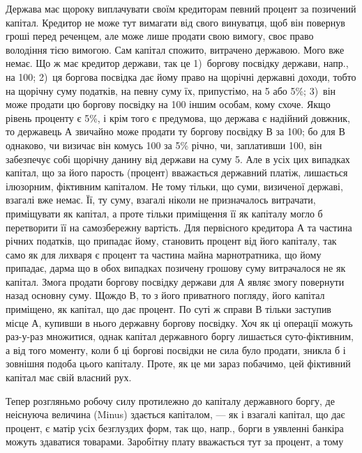 Держава має щороку виплачувати своїм кредиторам певний процент за
позичений капітал. Кредитор не може тут вимагати від свого винуватця, щоб він
повернув гроші перед реченцем, але може лише продати свою вимогу, своє
право володіння тією вимогою. Сам капітал спожито, витрачено державою. Мого
вже немає. Що ж має кредитор держави, так це 1)~боргову посвідку держави,
напр., на 100; 2)~ця боргова посвідка дає йому право на щорічні
державні доходи, тобто на щорічну суму податків, на певну суму їх, припустімо,
на 5 або 5\%; 3)~він може продати цю боргову посвідку на 100
іншим особам, кому схоче. Якщо рівень проценту є 5\%, і крім того є предумова,
що держава є надійний довжник, то державець $А$ звичайно може продати ту боргову
посвідку $В$ за 100; бо для $В$ однаково, чи визичає він комусь 100
за 5\% річно, чи, заплативши 100, він забезпечує собі щорічну данину
від держави на суму 5. Але в усіх цих випадках капітал, що за його
парость (процент) вважається державний платіж, лишається ілюзорним, фіктивним
капіталом. Не тому тільки, що суми, визиченої державі, взагалі вже немає.
Її, ту суму, взагалі ніколи не призначалось витрачати, приміщувати як капітал,
а проте тільки приміщення її як капіталу могло б перетворити її на самозбережну
вартість. Для первісного кредитора $А$ та частина річних податків, що припадає
йому, становить процент від його капіталу, так само як для лихваря є процент
та частина майна марнотратника, що йому припадає, дарма що в обох випадках
позичену грошову суму витрачалося не як капітал. Змога продати боргову
посвідку держави для $А$ являє змогу повернути назад основну суму. Щождо $В$,
то з його приватного погляду, його капітал приміщено, як капітал, що дає
процент. По суті ж справи $В$ тільки заступив місце $А$, купивши в нього
державну боргову посвідку. Хоч як ці операції можуть раз-у-раз множитися,
однак капітал державного боргу лишається суто-фіктивним, а від того моменту,
коли б ці боргові посвідки не сила було продати, зникла б і зовнішня подоба
цього капіталу. Проте, як це ми зараз побачимо, цей фіктивний капітал
має свій власний рух.

Тепер розгляньмо робочу силу протилежно до капіталу державного боргу,
де неіснуюча величина (Minus) здається капіталом, — як і взагалі капітал, що дає
процент, є матір усіх безглуздих форм, так що, напр., борги в уявленні банкіра
можуть здаватися товарами. Заробітну плату вважається тут за процент, а тому
\parbreak{}  %
